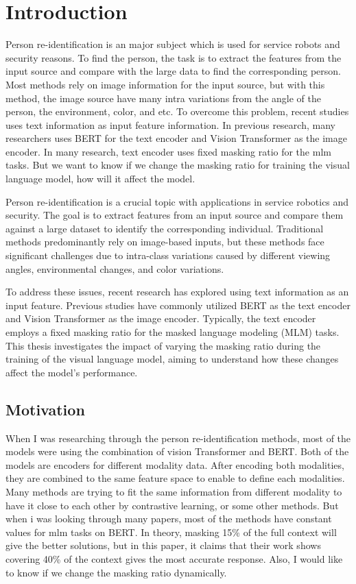 \chapter{Introduction}
Person re-identification is an major subject which is used for service robots and security reasons. 
To find the person, the task is to extract the features from the input source and compare with the large data to find the corresponding person. Most methods rely on image information for the input source,%
 but with this method, the image source have many intra variations from the angle of the person, the environment, color, and etc.
To overcome this problem, recent studies uses text information as input feature information. 
In previous research, many researchers uses BERT for the text encoder and Vision Transformer as the image encoder. In many research, text encoder uses fixed masking ratio for the mlm tasks. But we want to know if we change the masking ratio for training the visual language model, how will it affect the model. 


Person re-identification is a crucial topic with applications in service robotics and security. The goal is to extract features from an input source and compare them against a large dataset to identify the corresponding individual. Traditional methods predominantly rely on image-based inputs, but these methods face significant challenges due to intra-class variations caused by different viewing angles, environmental changes, and color variations.

To address these issues, recent research has explored using text information as an input feature. Previous studies have commonly utilized BERT as the text encoder and Vision Transformer as the image encoder. Typically, the text encoder employs a fixed masking ratio for the masked language modeling (MLM) tasks. This thesis investigates the impact of varying the masking ratio during the training of the visual language model, aiming to understand how these changes affect the model's performance.

\section{Motivation}
When I was researching through the person re-identification methods, most of the models were using the combination of vision Transformer and BERT. Both of the models are encoders for different modality data. After encoding both modalities, they are combined to the same feature space to enable to define each modalities. Many methods are trying to fit the same information from different modality to have it close to each other by contrastive learning, or some other methods. %
But when i was looking through many papers, most of the methods have constant values for mlm tasks on BERT. In theory, masking 15\% of the full context will give the better solutions, but in this paper, it claims that  their work shows covering 40\% of the context gives the most accurate response. Also, I would like to know if we change the masking ratio dynamically.


